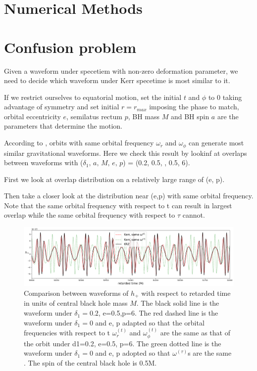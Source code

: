 \documentclass{article}
\begin{document}
\section{Numerical Methods}
\section{Confusion problem}

Given a waveform under specetiem with non-zero deformation parameter, we need to decide which waveform under Kerr specetime is most similar to it.

If we restrict ourselves to equatorial motion, set the initial $t$ and $\phi$ to 0 taking advantage of symmetry and set initial $r=r_{max}$ imposing the phase to match, orbital eccentricity $e$, semilatus rectum $p$, BH mass $M$ and BH spin $a$ are the parameters that determine the motion.

According to , orbits with same orbital frequency $\omega_r$ and $\omega_\phi$ can generate most similar gravitational waveforms. Here we check this result by lookinf at overlaps between waveforms with ($\delta_1,\, a,\, M,\, e,\, p$) = (0.2, 0.5, , 0.5, 6).

First we look at overlap distribution on a relatively large range of (e, p).

Then take a closer look at the distribution near (e,p) with same orbital frequency. Note that the same orbital frequency with respect to t can result in largest overlap while the same orbital frequency with respect to $\tau$ cannot.

\begin{figure}[!htb]
	\centering
	\includegraphics[width=16cm]{krz_kerr_wave.png}
	
	\caption{Comparison between waveforms of $h_+$ with respect to retarded time in units of central black hole mass $M$. The black solid line is the waveform under $\delta_1=0.2$, e=0.5,p=6. The red dashed line is the waveform under $\delta_1=0$ and e, p adapted so that the orbital frequencies with respect to t $\omega^{(t)}_r$ and $\omega^{(t)}_\phi$ are the same as that of the orbit under d1=0.2, e=0.5, p=6. The green dotted line is the waveform under $\delta_1 =0$ and e, p adopted so that $\omega^{(\tau)}$s are the same . The spin of the central black hole is 0.5M.}
	\label{range}
\end{figure}	
	
\end{document}
